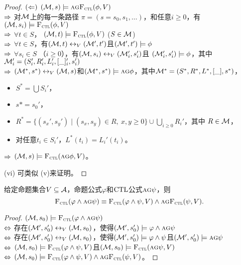 \begin{proof}
	$(\Leftarrow)$ $({\cal M}, s) \models \textsc{a} \textsc{g} {\textsc{F}_{\textsc{ctl}}}(\phi, V)$\\
	$\Rightarrow$ 对${\cal M}$上的每一条路径 $\pi=(s=s_0, s_1, \dots)$，和任意$i \geq 0$，有$({\cal M},s_i) \models {\textsc{F}_{\textsc{ctl}}}(\phi, V)$  \\ 
	$\Rightarrow$ $\forall t \in S$， $({\cal M},t) \models {\textsc{F}_{\textsc{ctl}}}(\phi, V)$ \hfill ($S \in {\cal M}$)\\
	$\Rightarrow$ $\forall t \in S$，有$({\cal M},t) \leftrightarrow_V ({\cal M}',t')$且$({\cal M}',t') \models \phi$\\
	$\Rightarrow$ $\forall s_i \in S$ （$i \geq 0$），有$({\cal M},s_i) \leftrightarrow_V ({\cal M}_i',s_i')$且 $({\cal M}_i',s_i') \models \phi$，其中${\cal M}_i' = (S_i',R_i', L_i', [\_]_i',s_i')$\\
	$\Rightarrow$ $({\cal M}^*,s^*) \leftrightarrow_V ({\cal M},s)$和$({\cal M}^*,s^*) \models \textsc{a} \textsc{g} \phi$，其中${\cal M}^*= (S^*, R^*,L^*, [\_], s^*)$，
	\begin{itemize}
		\item $S^*= \bigcup S_i'$， %
		\item $s* = s_0'$，
		\item $R^* = \{(s_x', s_y') \mid (s_x, s_y) \in R,\ x, y \geq 0\} \cup \bigcup_{i \geq 0} R_i'$，其中 $R\in {\cal M}$，
		\item 对任意$t_i\in S_i'$，$L^*(t_i) = L_i'(t_i)$。
	\end{itemize}
	$\Rightarrow$ $({\cal M},s) \models {\textsc{F}_{\textsc{ctl}}}(\textsc{a} \textsc{g} \phi, V)$。
	
	(vi) 可类似 (v)来证明。
\end{proof}


\begin{corollary}
	给定命题集合$V\subseteq {\cal A}$，命题公式$\varphi$和$\textrm{CTL}$公式$\textsc{a}\textsc{g} \psi$，则
	$${\textsc{F}_{\textsc{ctl}}}(\varphi \wedge \textsc{a}\textsc{g} \psi)\equiv {\textsc{F}_{\textsc{ctl}}}(\varphi \wedge \psi, V) \wedge \textsc{a}\textsc{g}{\textsc{F}_{\textsc{ctl}}}(\psi, V).$$
\end{corollary}
\begin{proof}
	 $({\cal M},s_0) \models {\textsc{F}_{\textsc{ctl}}}(\varphi \wedge \textsc{a}\textsc{g} \psi)$\\
	$\Leftrightarrow$ 存在$({\cal M}',s_0')  \leftrightarrow_V ({\cal M},s_0)$，使得$({\cal M}',s_0') \models \varphi \wedge \textsc{a}\textsc{g} \psi$\\
	$\Leftrightarrow$ 存在$({\cal M}',s_0')  \leftrightarrow_V ({\cal M},s_0)$，使得$({\cal M}',s_0') \models \varphi \wedge \psi$且$({\cal M}',s_0') \models \textsc{a}\textsc{g} \psi$\\
	$\Leftrightarrow$%
	$({\cal M},s_0) \models {\textsc{F}_{\textsc{ctl}}}(\varphi \wedge \psi,V)$且$({\cal M},s_0) \models {\textsc{F}_{\textsc{ctl}}}(\textsc{a}\textsc{g} \psi,V)$\\
	$\Leftrightarrow$ $({\cal M},s_0) \models {\textsc{F}_{\textsc{ctl}}}(\varphi \wedge \psi,V)\wedge \textsc{a}\textsc{g}{\textsc{F}_{\textsc{ctl}}}( \psi,V)$。
\end{proof}
